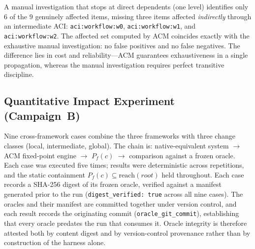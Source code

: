 \documentclass[10pt]{article}
\begin{document}
A manual investigation that stops at direct dependents (one level)
identifies only $6$ of the $9$ genuinely affected items, missing three
items affected \emph{indirectly} through an intermediate ACI:
\texttt{aci:workflow:w0}, \texttt{aci:workflow:w1}, and
\texttt{aci:workflow:w2}. The affected set computed by ACM coincides
exactly with the exhaustive manual investigation: no false positives and
no false negatives. The difference lies in cost and reliability---ACM
guarantees exhaustiveness in a single propagation, whereas the manual
investigation requires perfect transitive discipline.

\subsection{Quantitative Impact Experiment (Campaign~B)}
\label{app:report-impact-quantitative}

Nine cross-framework cases combine the three frameworks with three change
classes (local, intermediate, global). The chain is: native-equivalent
system $\rightarrow$ ACM fixed-point engine $\rightarrow$ $P_f(c)$
$\rightarrow$ comparison against a frozen oracle. Each case was executed
five times; results were deterministic across repetitions, and the static
containment $P_f(c) \subseteq \mathrm{reach}(\mathit{root})$ held
throughout.
Each case records a SHA-256 digest of its frozen oracle, verified against a manifest generated prior to the run (\texttt{digest\_verified: true} across all nine cases). The oracles and their manifest are committed together under version control, and each result records the originating commit (\texttt{oracle\_git\_commit}), establishing that every oracle predates the run that consumes it. Oracle integrity is therefore attested both by content digest and by version-control provenance rather than by construction of the harness alone. 
\end{document}

